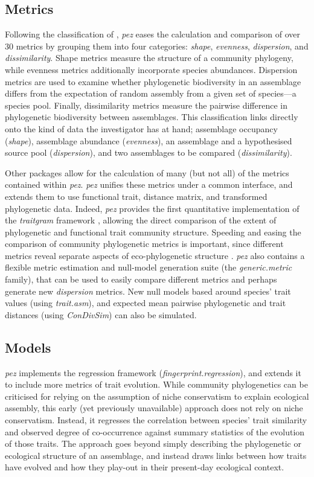 \documentclass{bioinfo}
\begin{document}
\subsection{Metrics}
Following the classification of \citet{Pearse2014review}, \emph{pez}
eases the calculation and comparison of over 30 metrics by grouping
them into four categories: \emph{shape}, \emph{evenness},
\emph{dispersion}, and \emph{dissimilarity}. Shape metrics measure the
structure of a community phylogeny, while evenness metrics
additionally incorporate species abundances. Dispersion metrics are
used to examine whether phylogenetic biodiversity in an assemblage
differs from the expectation of random assembly from a given set of
species---a species pool. Finally, dissimilarity metrics measure the
pairwise difference in phylogenetic biodiversity between
assemblages. This classification links directly onto the kind of data
the investigator has at hand; assemblage occupancy (\emph{shape}),
assemblage abundance (\emph{evenness}), an assemblage and a
hypothesised source pool (\emph{dispersion}), and two assemblages to
be compared (\emph{dissimilarity}).

Other packages \citep[notably][]{Kembel2010} allow for the calculation
of many (but not all) of the metrics contained within
\emph{pez}. \emph{pez} unifies these metrics under a common interface,
and extends them to use functional trait, distance matrix, and
transformed phylogenetic \citep[\emph{sensu}][]{Letten2014}
data. Indeed, \emph{pez} provides the first quantitative
implementation of the \emph{traitgram} framework
\citep{Ackerly2009,Cadotte2013}, allowing the direct comparison of the
extent of phylogenetic and functional trait community
structure. Speeding and easing the comparison of community
phylogenetic metrics is important, since different metrics reveal
separate aspects of eco-phylogenetic structure
\citep{Cadotte2010}. \emph{pez} also contains a flexible metric
estimation and null-model generation suite (the \emph{generic.metric}
family), that can be used to easily compare different metrics and
perhaps generate new \emph{dispersion} metrics. New null models based
around species' trait values (using \emph{trait.asm}), and expected
mean pairwise phylogenetic and trait distances (using
\emph{ConDivSim}) can also be simulated.
\subsection{Models}
\emph{pez} implements the \citet{Cavender-Bares2004} regression
framework (\emph{fingerprint.regression}), and extends it to include
more metrics of trait evolution. While community phylogenetics can be
criticised for relying on the assumption of niche conservatism to
explain ecological assembly, this early (yet previously unavailable)
approach does not rely on niche conservatism. Instead, it regresses
the correlation between species' trait similarity and observed degree
of co-occurrence against summary statistics of the evolution of those
traits. The approach goes beyond simply describing the phylogenetic or
ecological structure of an assemblage, and instead draws links between
how traits have evolved and how they play-out in their present-day
ecological context.
\end{document}
